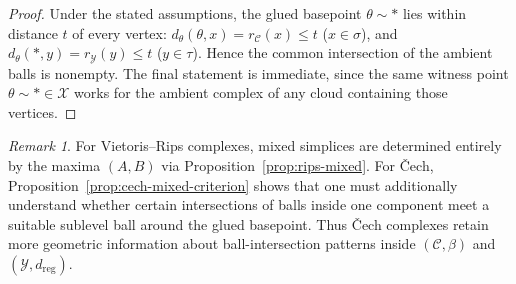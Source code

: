\documentclass[11pt]{amsart}
\theoremstyle{definition}
\theoremstyle{remark}
\newtheorem{remark}[theorem]{Remark}
\newcommand{\1}{\mathbbm{1}}
\begin{document}
\begin{proof}
Under the stated assumptions, the glued basepoint $\theta\sim\ast$ lies within distance $t$ of every vertex: $d_\theta(\theta,x)=r_{\mathcal C}(x)\le t$ ($x\in\sigma$),
and $d_\theta(\ast,y)=r_{\mathcal Y}(y)\le t$ ($y\in\tau$).
Hence the common intersection of the ambient balls is nonempty.
The final statement is immediate, since the same witness point $\theta\sim\ast\in\mathcal X$
works for the ambient complex of any cloud containing those vertices.
\end{proof}

\begin{remark}
For Vietoris--Rips complexes, mixed simplices are determined entirely by the maxima $(A,B)$ via
Proposition~\ref{prop:rips-mixed}.
For \v{C}ech, Proposition~\ref{prop:cech-mixed-criterion} shows that one must additionally understand
whether certain intersections of balls inside one component meet a suitable sublevel ball around the
glued basepoint.
Thus \v{C}ech complexes retain more geometric information about ball-intersection patterns inside
$(\mathcal C,\beta)$ and $(\mathcal Y,d_{\mathrm{reg}})$.
\end{remark}
\end{document}
